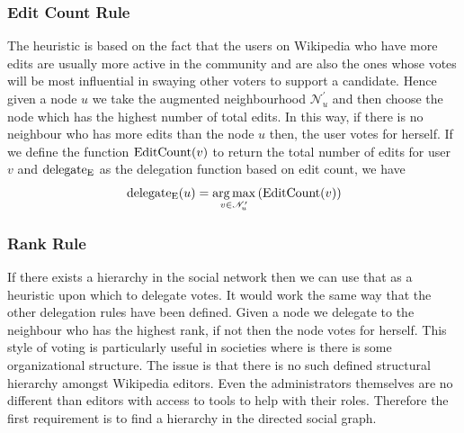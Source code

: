 \subsubsection{Edit Count Rule}
The heuristic is based on the fact that the users on Wikipedia who have more edits are usually more active in the community and are also the ones whose votes will be most influential in swaying other voters to support a candidate. Hence given a node $u$ we take the augmented neighbourhood $\mathcal{N}_u^{\prime}$ and then choose the node which has the highest number of total edits. In this way, if there is no neighbour who has more edits than the node $u$ then, the user votes for herself. If we define the function $\operatorname*{EditCount}(v)$ to return the total number of edits for user $v$ and $\operatorname*{delegate_E}$ as the delegation function based on edit count, we have 
\[\operatorname*{delegate_E}(u)  = \operatorname*{arg\,max}_{v \in \mathcal{N}_u^\prime} \left(\operatorname*{EditCount}(v) \right)\]

\subsubsection{Rank Rule}
If there exists a hierarchy in the social network then we can use that as a heuristic upon which to delegate votes. It would work the same way that the other delegation rules have been defined. Given a node we delegate to the neighbour who has the highest rank, if not then the node votes for herself. This style of voting is particularly useful in societies where is there is some organizational structure. The issue is that there is no such defined structural hierarchy amongst Wikipedia editors. Even the administrators themselves are no different than editors with access to tools to help with their roles. Therefore the first requirement is to find a hierarchy in the directed social graph.

